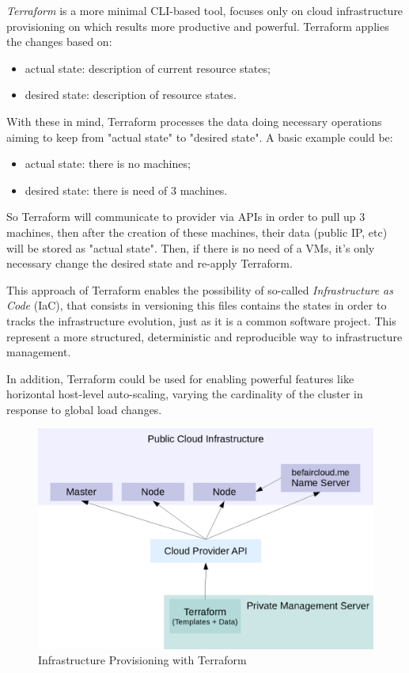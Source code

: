 \textit{Terraform} is a more minimal CLI-based tool, focuses only on cloud infrastructure provisioning on which results more productive and powerful.  Terraform applies the changes based on:
\begin{itemize}
\item actual state:  description of current resource states;
\item desired state:  description of resource states.
\end{itemize}

With these in mind, Terraform processes the data doing necessary operations aiming to keep from "actual state" to "desired state".  A basic example could be:
\begin{itemize}
\item actual state:  there is no machines;
\item desired state:  there is need of 3 machines.
\end{itemize}

So Terraform will communicate to provider via APIs in order to pull up 3 machines, then after the creation of these machines, their data (public IP, etc) will be stored as "actual state".  Then, if there is no need of a VMs, it's only necessary change the desired state and re-apply Terraform.

This approach of Terraform enables the possibility of so-called \textit{Infrastructure as Code} (IaC), that consists in versioning this files contains the states in order to tracks the infrastructure evolution, just as it is a common software project.  This represent a more structured, deterministic and reproducible way to infrastructure management.

In addition, Terraform could be used for enabling powerful features like horizontal host-level auto-scaling, varying the cardinality of the cluster in response to global load changes.

\begin{figure}[htbp]
\centering
\includegraphics{media/ch4-terraform.png}
\caption{Infrastructure Provisioning with Terraform}
\end{figure}

